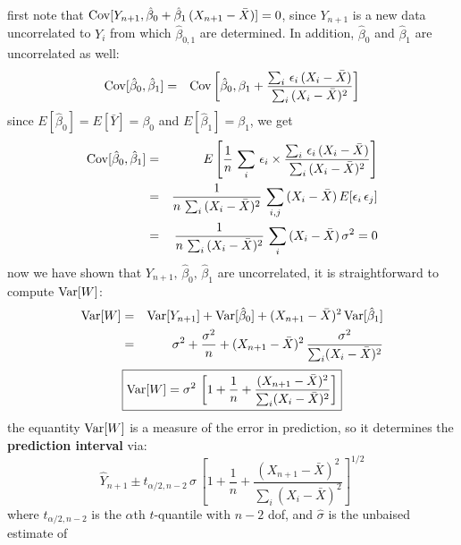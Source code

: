 \documentclass[aps,prl,preprint,superscriptaddress]{revtex4-1}
\begin{document}
first note that ${\rm Cov}[Y_{n+1}, {\hat \beta}_0 + {\hat \beta}_1\, (X_{n+1} - {\bar X})] = 0$, since 
$Y_{n+1}$ is a new data uncorrelated to $Y_i$ from which ${\hat \beta}_{0,1}$ are determined. In addition,
${\hat \beta}_0$ and ${\hat \beta}_1$ are uncorrelated as well:
%
\begin{eqnarray}
{\rm Cov}[{\hat \beta}_0, {\hat \beta}_1] &=& {\rm Cov}\left[ {\hat \beta}_0, 
         \beta_1 + \frac{\sum_i\, \epsilon_i\, (X_i - {\bar X})}{\sum_i\, (X_i - {\bar X})^2} \right] \nonumber\\
%
\end{eqnarray}
%
since $E[{\hat \beta}_0] =  E[{\bar Y}] = \beta_0$ and $E[{\hat \beta}_1] = \beta_1$, we get
%
\begin{eqnarray}
{\rm Cov}[{\hat \beta}_0, {\hat \beta}_1] &=& E\left[ \frac{1}{n}\, \sum_i\, \epsilon_i \times
   \frac{\sum_i\, \epsilon_i\, (X_i - {\bar X})}{\sum_i\, (X_i - {\bar X})^2} \right] \nonumber\\
%
 &=& \frac{1}{n\, \sum_i\, (X_i - {\bar X})^2}\, \sum_{i,j}\, (X_i - {\bar X})\, E[\epsilon_i\, \epsilon_j] \nonumber\\
 &=& \frac{1}{n\, \sum_i\, (X_i - {\bar X})^2}\, \sum_i\, (X_i - {\bar X})\, \sigma^2 = 0
\end{eqnarray}
%
now we have shown that $Y_{n+1},\, {\hat \beta}_0, \, {\hat \beta}_1$ are uncorrelated, it is straightforward 
to compute ${\rm Var}[W]$:
%
\begin{eqnarray}
{\rm Var}[W] &=& {\rm Var}[Y_{n+1}] + {\rm Var}[{\hat \beta}_0] + (X_{n+1} - {\bar X})^2\, {\rm Var}[{\hat \beta}_1] \nonumber\\
  &=& \sigma^2 + \frac{\sigma^2}{n} + (X_{n+1} - {\bar X})^2\, \frac{\sigma^2}{\sum_i (X_i - {\bar X})^2} \nonumber\\
\end{eqnarray}
%
\begin{equation}
%
\boxed{
{\rm Var}[W] = \sigma^2\, \left[ 1 + \frac{1}{n} + \frac{(X_{n+1} - {\bar X})^2}{\sum_i (X_i - {\bar X})^2} \right]
}
\end{equation}
%
the equantity ${\rm Var}[W]$ is a measure of the error in prediction, so it determines the {\bf prediction interval} via:
%
\begin{equation}
{\hat Y}_{n+1} \pm t_{\alpha/2, n-2}\, {\hat \sigma}\, 
\left[ 1 + \frac{1}{n} + \frac{(X_{n+1} - {\bar X})^2}{\sum_i (X_i - {\bar X})^2} \right]^{1/2}
\end{equation}
%
where $t_{\alpha/2, n-2}$ is the $\alpha$th $t$-quantile with $n-2$ dof, and ${\hat \sigma}$ is the unbaised estimate of 
\end{document}
